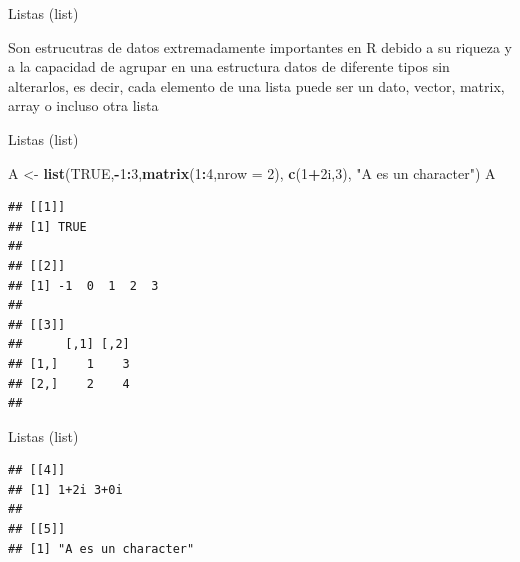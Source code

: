 \documentclass[ignorenonframetext,]{beamer}
\newenvironment{Shaded}{\begin{snugshade}}{\end{snugshade}}
\newcommand{\KeywordTok}[1]{\textcolor[rgb]{0.13,0.29,0.53}{\textbf{#1}}}
\newcommand{\DataTypeTok}[1]{\textcolor[rgb]{0.13,0.29,0.53}{#1}}
\newcommand{\DecValTok}[1]{\textcolor[rgb]{0.00,0.00,0.81}{#1}}
\newcommand{\StringTok}[1]{\textcolor[rgb]{0.31,0.60,0.02}{#1}}
\newcommand{\OtherTok}[1]{\textcolor[rgb]{0.56,0.35,0.01}{#1}}
\newcommand{\OperatorTok}[1]{\textcolor[rgb]{0.81,0.36,0.00}{\textbf{#1}}}
\newcommand{\NormalTok}[1]{#1}
\begin{document}
\begin{frame}{Listas (list)}

Son estrucutras de datos extremadamente importantes en R debido a su
riqueza y a la capacidad de agrupar en una estructura datos de diferente
tipos sin alterarlos, es decir, cada elemento de una lista puede ser un
dato, vector, matrix, array o incluso otra lista

\end{frame}

\begin{frame}[fragile]{Listas (list)}

\begin{Shaded}
\begin{Highlighting}[]
\NormalTok{A <-}\StringTok{ }\KeywordTok{list}\NormalTok{(}\OtherTok{TRUE}\NormalTok{,}\OperatorTok{-}\DecValTok{1}\OperatorTok{:}\DecValTok{3}\NormalTok{,}\KeywordTok{matrix}\NormalTok{(}\DecValTok{1}\OperatorTok{:}\DecValTok{4}\NormalTok{,}\DataTypeTok{nrow =} \DecValTok{2}\NormalTok{), }\KeywordTok{c}\NormalTok{(}\DecValTok{1}\OperatorTok{+}\NormalTok{2i,}\DecValTok{3}\NormalTok{),}
          \StringTok{"A es un character"}\NormalTok{)}
\NormalTok{A}
\end{Highlighting}
\end{Shaded}

\begin{verbatim}
## [[1]]
## [1] TRUE
## 
## [[2]]
## [1] -1  0  1  2  3
## 
## [[3]]
##      [,1] [,2]
## [1,]    1    3
## [2,]    2    4
## 
\end{verbatim}

\end{frame}

\begin{frame}[fragile]{Listas (list)}

\begin{verbatim}
## [[4]]
## [1] 1+2i 3+0i
## 
## [[5]]
## [1] "A es un character"
\end{verbatim}

\end{frame}
\end{document}
